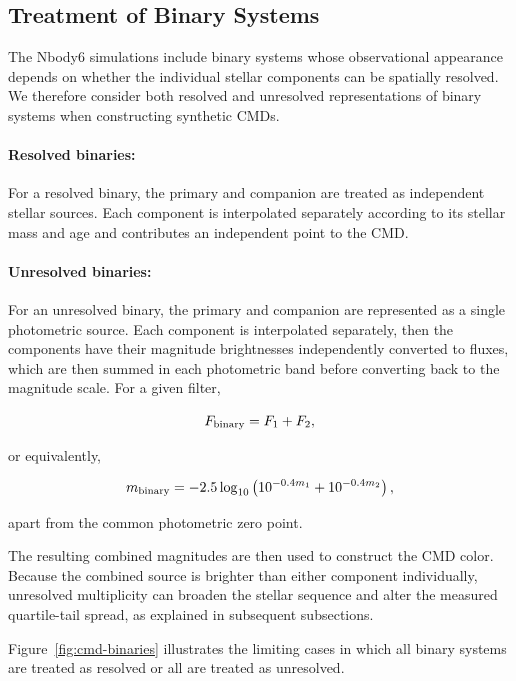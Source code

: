 \documentclass[linenumbers, twocolumn]{aastex631}
\begin{document}
\subsection{Treatment of Binary Systems}
\label{sec:binaries}
The Nbody6 simulations include binary systems whose observational appearance depends on whether the individual stellar components can be spatially resolved. We therefore consider both resolved and unresolved representations of binary systems when constructing synthetic CMDs.

\paragraph{Resolved binaries:}
For a resolved binary, the primary and companion are treated as independent stellar sources. Each component is interpolated separately according to its stellar mass and age and contributes an independent point to the CMD.

\paragraph{Unresolved binaries:}
For an unresolved binary, the primary and companion are represented as a single photometric source. Each component is interpolated separately, then the components have their magnitude brightnesses independently converted to fluxes, which are then summed in each photometric band before converting back to the magnitude scale. For a given filter,

\begin{equation}
F_{\rm binary}=F_1+F_2,
\end{equation}

or equivalently,

\begin{equation}
m_{\rm binary}
=
-2.5\log_{10}
\left(
10^{-0.4m_1}+10^{-0.4m_2}
\right),
\end{equation}

apart from the common photometric zero point.

The resulting combined magnitudes are then used to construct the CMD color. Because the combined source is brighter than either component individually, unresolved multiplicity can broaden the stellar sequence and alter the measured quartile-tail spread, as explained in subsequent subsections.

Figure~\ref{fig:cmd-binaries} illustrates the limiting cases in which all binary systems are treated as resolved or all are treated as unresolved.
\end{document}
